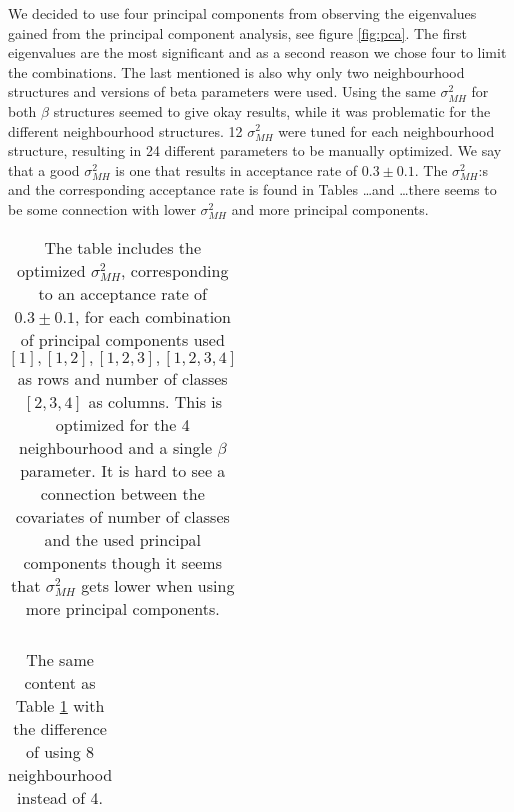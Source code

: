 \documentclass[a4paper,english]{article}
\begin{document}
We decided to use four principal components from observing the eigenvalues gained from the principal component analysis, see figure \ref{fig:pca}. The first eigenvalues are the most significant and as a second reason we chose four to limit the combinations. The last mentioned is also why only two neighbourhood structures and versions of beta parameters were used.
Using the same $\sigma_{MH}^2$ for both $\beta$ structures seemed to give okay results, while it was problematic for the different neighbourhood structures. 12 $\sigma_{MH}^2$ were tuned for each neighbourhood structure, resulting in 24 different parameters to be manually optimized.
We say that a good $\sigma_{MH}^2$ is one that results in acceptance rate of $0.3 \pm 0.1$.
The $\sigma_{MH}^2$:s and the corresponding acceptance rate is found in Tables \dots and \dots there seems to be some connection with lower $\sigma_{MH}^2$ and more principal components.

\begin{table}
  \centering
  \begin{tabular}{c c c}
    
  \end{tabular}
  \caption{The table includes the optimized $\sigma_{MH}^2$, corresponding to an acceptance rate of $0.3 \pm 0.1$, for each combination of principal components used ${[1], [1,2], [1,2,3], [1,2,3,4]}$ as rows and number of classes $[2, 3, 4]$ as columns. This is optimized for the 4 neighbourhood and a single $\beta$ parameter. It is hard to see a connection between the covariates of number of classes and the used principal components though it seems that $\sigma_{MH}^2$ gets lower when using more principal components.}
  \label{tab:sigma:n1}
\end{table}

\begin{table}
  \centering
  \begin{tabular}{c c c}
    
  \end{tabular}
  \caption{The same content as Table \ref{tab:sigma:n1} with the difference of using 8 neighbourhood instead of 4.}
  \label{tab:sigma:n2}
\end{table}
\end{document}
